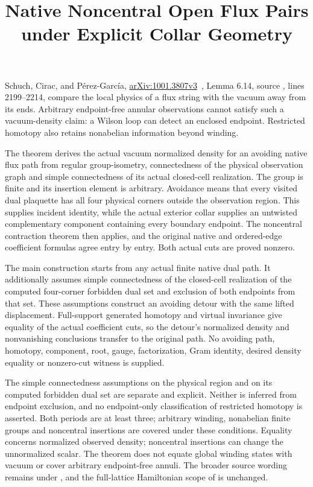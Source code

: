\documentclass{article}
\title{Native Noncentral Open Flux Pairs under Explicit Collar Geometry}
\author{}
\date{}
\begin{document}
\maketitle
{}

Schuch, Cirac, and P\'erez-Garc\'ia,
\href{https://arxiv.org/abs/1001.3807v3}{arXiv:1001.3807v3}~\cite{Schuch2010PEPS},
Lemma 6.14, source
, lines 2199--2214,
compare the local physics of a flux string with the vacuum away from its
ends. Arbitrary endpoint-free annular observations cannot satisfy such a
vacuum-density claim: a Wilson loop can detect an enclosed endpoint.
Restricted homotopy also retains nonabelian information beyond winding.

The theorem
derives the actual vacuum normalized density for an avoiding native flux
path from regular group-isometry, connectedness of the physical observation
graph and simple connectedness of its actual closed-cell realization.
The group is finite and its insertion element is arbitrary. Avoidance
means that every visited dual plaquette has all four physical corners
outside the observation region. This supplies incident identity, while
the actual exterior collar supplies an untwisted complementary component
containing every boundary endpoint. The noncentral contraction theorem
then applies, and the original native and ordered-edge coefficient formulas
agree entry by entry. Both actual cuts are proved nonzero.

The main construction
starts from any actual finite native dual path. It additionally assumes
simple connectedness of the closed-cell realization of the computed
four-corner forbidden dual set and exclusion of both endpoints from that
set. These assumptions construct an avoiding detour with the same lifted
displacement. Full-support generated homotopy and virtual invariance give
equality of the actual coefficient cuts, so the detour's normalized density
and nonvanishing conclusions transfer to the original path. No avoiding
path, homotopy, component, root, gauge, factorization, Gram identity,
desired density equality or nonzero-cut witness is supplied.

The simple connectedness assumptions on the physical region and on its
computed forbidden dual set are separate and explicit. Neither is inferred
from endpoint exclusion, and no endpoint-only classification of restricted
homotopy is asserted. Both periods are at least three; arbitrary winding,
nonabelian finite groups and noncentral insertions are covered under these
conditions. Equality concerns normalized observed density; noncentral
insertions can change the unnormalized scalar. The theorem does not equate
global winding states with vacuum or cover arbitrary endpoint-free annuli.
The broader source wording remains under , and the
full-lattice Hamiltonian scope of  is unchanged.


\end{document}
